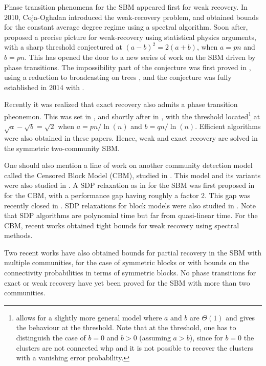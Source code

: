 \documentclass[11pt]{article}
\newcommand{\1}{\mathbb{1}}
\begin{document}
Phase transition phenomena for the SBM appeared first for weak recovery. In 2010, Coja-Oghalan \cite{coja-sbm} introduced the weak-recovery problem, and obtained bounds for the constant average degree regime using a spectral algorithm. Soon after, \cite{decelle} proposed a precise picture for weak-recovery using statistical physics arguments, with a sharp threshold conjectured at $(a-b)^2 = 2(a+b)$, when $a=pn$ and $b=pn$. This has opened the door to a new series of work on the SBM driven by phase transitions. The impossibility part of the conjecture was first proved in \cite{mossel-sbm}, using a reduction to broadcasting on trees \cite{evans}, and the conjecture was fully established in 2014 with \cite{massoulie-STOC,Mossel_SBM2}. 

Recently it was realized that exact recovery also admits a phase transition pheonemon. This was set in \cite{abh}, and shortly after in \cite{mossel-consist}, with the threshold located\footnote{\cite{mossel-consist} allows for a slightly more general model where $a$ and $b$ are $\Theta(1)$ and gives the behaviour at the threshold. Note that at the threshold, one has to distinguish the case of $b=0$ and $b>0$ (assuming $a>b$), since for $b=0$ the clusters are not connected whp and it is not possible to recover the clusters with a vanishing error probability.} at $\sqrt{a}-\sqrt{b} = \sqrt{2}$ when $a=pn/ \ln(n)$ and $b=qn/ \ln(n)$. Efficient algorithms were also obtained in these papers. Hence, weak and exact recovery are solved in the symmetric two-community SBM.  


One should also mention a line of work on another community detection model called the Censored Block Model (CBM), studied in \cite{random,abbs}. This model and its variants were also studied in \cite{abbetoc,Huang_Guibas_Graphics,Chen_Huang_Guibas_Graphics,Chen_Goldsmith_ISIT2014,abbs-isit,rough}. A SDP relaxation as in \cite{abh} for the SBM was first proposed in \cite{abbs} for the CBM, with a performance gap having roughly a factor 2. This gap was recently closed in \cite{new-xu}. 
SDP relaxations for block models were also studied in \cite{chen-xu,levina,sbm-groth}. Note that SDP algorithms are polynomial time but far from quasi-linear time. For the CBM, recent works \cite{new-vu,florent_CBM} obtained tight bounds for weak recovery using spectral methods.  

Two recent works \cite{sbm-groth,new-vu} have also obtained bounds for partial recovery in the SBM with multiple communities, for the case of symmetric blocks or with bounds on the connectivity probabilities in terms of symmetric blocks. No phase transitions for exact or weak recovery have yet been proved for the SBM with more than two communities. %
\end{document}
